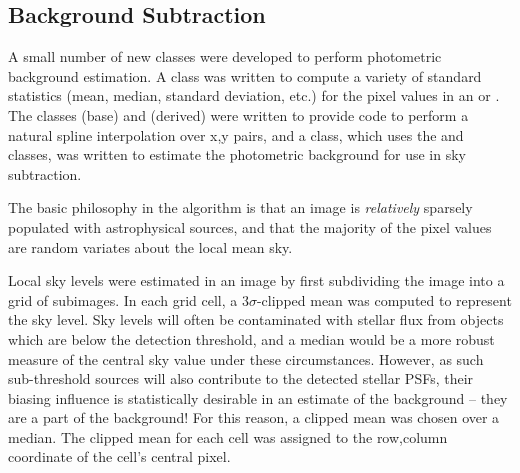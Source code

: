 
\subsection{Background Subtraction}


A small number of new classes were developed to perform photometric
background estimation.  A  class was written to compute a
variety of standard statistics (mean, median, standard deviation,
etc.) for the pixel values in an  or .  The classes
 (base) and  (derived) were written to
provide code to perform a natural spline interpolation over x,y pairs,
and a  class, which uses the  and 
classes, was written to estimate the photometric background for use in
sky subtraction.


The basic philosophy in the algorithm is that an image is {\itshape
relatively} sparsely populated with astrophysical sources, and that the
majority of the pixel values are random variates about the local mean
sky.


Local sky levels were estimated in an image by first subdividing the
image into a grid of subimages.  In each grid cell, a
3$\sigma$-clipped mean was computed to represent the sky level.  Sky
levels will often be contaminated with stellar flux from objects which
are below the detection threshold, and a median would be a more robust
measure of the central sky value under these circumstances.  However,
as such sub-threshold sources will also contribute to the detected
stellar PSFs, their biasing influence is statistically desirable in an
estimate of the background -- they are a part of the background!  For
this reason, a clipped mean was chosen over a median.  The clipped
mean for each cell was assigned to the row,column coordinate of the
cell's central pixel.


